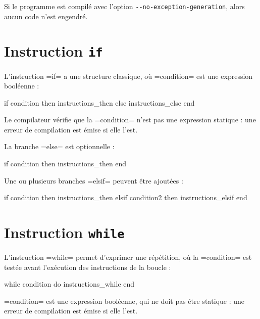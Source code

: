 Si le programme est compilé avec l'option \texttt{-{}-no-exception-generation}, alors aucun code n'est engendré.








\section{Instruction \texttt{if}}

L'instruction \plm=if= a une structure classique, où \plm=condition= est une expression booléenne :
\begin{PLM}
if condition then
  instructions_then
else
  instructions_else
end
\end{PLM}

Le compilateur vérifie que la \plm=condition= n'est pas une expression statique : une erreur de compilation est émise si elle l'est.

La branche \plm=else= est optionnelle :
\begin{PLM}
if condition then
  instructions_then
end
\end{PLM}


Une ou plusieurs branches \plm=elsif= peuvent être ajoutées :
\begin{PLM}
if condition then
  instructions_then
elsif condition2 then
  instructions_elsif
end
\end{PLM}






\section{Instruction \texttt{while}}

L'instruction \plm=while= permet d'exprimer une répétition, où la \plm=condition= est testée avant l'exécution des instructions de la boucle :
\begin{PLM}
while condition do
  instructions_while
end
\end{PLM}

\plm=condition= est une expression booléenne, qui ne doit pas être statique : une erreur de compilation est émise si elle l'est.

